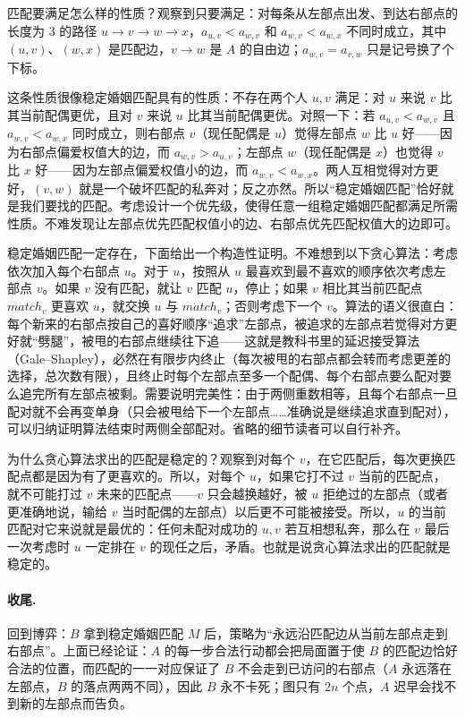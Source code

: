 \documentclass[UTF8,a4paper,11pt,oneside,openany,fontset=fandol]{ctexbook}
\theoremstyle{definition}
\begin{document}
匹配要满足怎么样的性质？观察到只要满足：对每条从左部点出发、到达右部点的长度为 $3$ 的路径 $u\to v\to w\to x$，$a_{u,v}<a_{w,v}$ 和 $a_{w,v}<a_{w,x}$ 不同时成立，其中 $(u,v)$、$(w,x)$ 是匹配边，$v\to w$ 是 $A$ 的自由边；$a_{w,v}=a_{v,w}$ 只是记号换了个下标。

这条性质很像稳定婚姻匹配具有的性质：不存在两个人 $u,v$ 满足：对 $u$ 来说 $v$ 比其当前配偶更优，且对 $v$ 来说 $u$ 比其当前配偶更优。对照一下：若 $a_{u,v}<a_{w,v}$ 且 $a_{w,v}<a_{w,x}$ 同时成立，则右部点 $v$（现任配偶是 $u$）觉得左部点 $w$ 比 $u$ 好——因为右部点偏爱权值大的边，而 $a_{w,v}>a_{u,v}$；左部点 $w$（现任配偶是 $x$）也觉得 $v$ 比 $x$ 好——因为左部点偏爱权值小的边，而 $a_{w,v}<a_{w,x}$。两人互相觉得对方更好，$(v,w)$ 就是一个破坏匹配的私奔对；反之亦然。所以“稳定婚姻匹配”恰好就是我们要找的匹配。考虑设计一个优先级，使得任意一组稳定婚姻匹配都满足所需性质。不难发现让左部点优先匹配权值小的边、右部点优先匹配权值大的边即可。

稳定婚姻匹配一定存在，下面给出一个构造性证明。不难想到以下贪心算法：考虑依次加入每个右部点 $u$。对于 $u$，按照从 $u$ 最喜欢到最不喜欢的顺序依次考虑左部点 $v$。如果 $v$ 没有匹配，就让 $v$ 匹配 $u$，停止；如果 $v$ 相比其当前匹配点 $match_v$ 更喜欢 $u$，就交换 $u$ 与 $match_v$；否则考虑下一个 $v$。算法的语义很直白：每个新来的右部点按自己的喜好顺序“追求”左部点，被追求的左部点若觉得对方更好就“劈腿”，被甩的右部点继续往下追——这就是教科书里的延迟接受算法（Gale--Shapley），必然在有限步内终止（每次被甩的右部点都会转而考虑更差的选择，总次数有限），且终止时每个左部点至多一个配偶、每个右部点要么配对要么追完所有左部点被剩。需要说明完美性：由于两侧重数相等，且每个右部点一旦配对就不会再变单身（只会被甩给下一个左部点……准确说是继续追求直到配对），可以归纳证明算法结束时两侧全部配对。省略的细节读者可以自行补齐。

为什么贪心算法求出的匹配是稳定的？观察到对每个 $v$，在它匹配后，每次更换匹配点都是因为有了更喜欢的。所以，对每个 $u$，如果它打不过 $v$ 当前的匹配点，就不可能打过 $v$ 未来的匹配点——$v$ 只会越换越好，被 $u$ 拒绝过的左部点（或者更准确地说，输给 $v$ 当时配偶的左部点）以后更不可能被接受。所以，$u$ 的当前匹配对它来说就是最优的：任何未配对成功的 $u,v$ 若互相想私奔，那么在 $v$ 最后一次考虑时 $u$ 一定排在 $v$ 的现任之后，矛盾。也就是说贪心算法求出的匹配就是稳定的。

\paragraph{收尾.} 回到博弈：$B$ 拿到稳定婚姻匹配 $M$ 后，策略为“永远沿匹配边从当前左部点走到右部点”。上面已经论证：$A$ 的每一步合法行动都会把局面置于使 $B$ 的匹配边恰好合法的位置，而匹配的一一对应保证了 $B$ 不会走到已访问的右部点（$A$ 永远落在左部点，$B$ 的落点两两不同），因此 $B$ 永不卡死；图只有 $2n$ 个点，$A$ 迟早会找不到新的左部点而告负。
\end{document}
